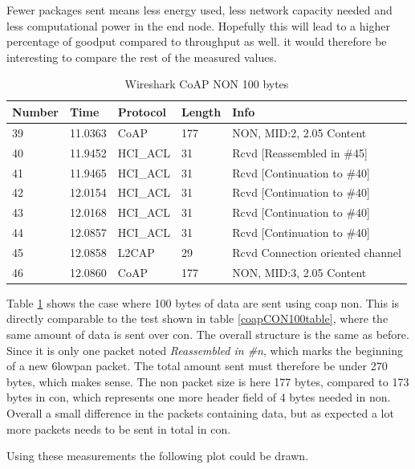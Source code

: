 Fewer packages sent means less energy used, less network capacity needed and less computational power in the end node. Hopefully this will lead to a higher percentage of goodput compared to throughput as well. it would therefore be interesting to compare the rest of the measured values.

\begin{table}[]
\centering
\caption{Wireshark CoAP NON 100 bytes}
\label{coapNON100table}
\begin{tabular}{lllll}
\hline
Number & Time    & Protocol & Length & Info   							  \\ \hline                          
39     & 11.0363 & CoAP     & 177    & NON, MID:2, 2.05 Content         \\
40     & 11.9452 & HCI\_ACL & 31     & Rcvd {[}Reassembled in \#45{]}   \\
41     & 11.9465 & HCI\_ACL & 31     & Rcvd {[}Continuation to \#40{]}  \\
42     & 12.0154 & HCI\_ACL & 31     & Rcvd {[}Continuation to \#40{]}  \\
43     & 12.0168 & HCI\_ACL & 31     & Rcvd {[}Continuation to \#40{]}  \\
44     & 12.0857 & HCI\_ACL & 31     & Rcvd {[}Continuation to \#40{]}  \\
45     & 12.0858 & L2CAP    & 29     & Rcvd Connection oriented channel \\
46     & 12.0860 & CoAP     & 177    & NON, MID:3, 2.05 Content         \\ \hline
\end{tabular}
\end{table}

Table \ref{coapNON100table} shows the case where 100 bytes of data are sent using \gls{coap} \gls{non}. This is directly comparable to the test shown in table \ref{coapCON100table}, where the same amount of data is sent over \gls{con}. The overall structure is the same as before. Since it is only one packet noted \textit{Reassembled in \#n}, which marks the beginning of a new \gls{6lowpan} packet. The total amount sent must therefore be under 270 bytes, which makes sense. The \gls{non} packet size is here 177 bytes, compared to 173 bytes in \gls{con}, which represents one more header field of 4 bytes needed in \gls{non}. Overall a small difference in the packets containing data, but as expected a lot more packets needs to be sent in total in \gls{con}.


Using these measurements the following plot could be drawn. 

